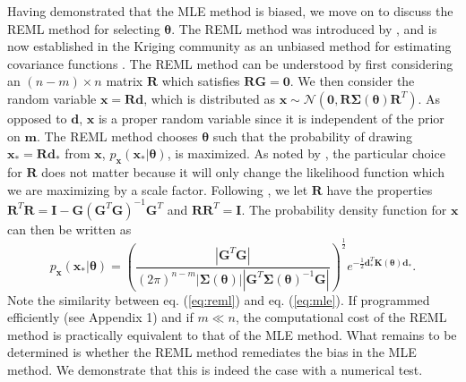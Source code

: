 \documentclass{svjour3}                     %
\begin{document}
Having demonstrated that the MLE method is biased, we move on to discuss the REML method for selecting $\mathbf{\theta}$.  The REML method was introduced by \citet{Patterson1971}, and is now established in the Kriging community as an unbiased method for estimating covariance functions \citep[e.g.,][]{Cressie1992}. The REML method can be understood by first considering an $(n-m)\times n$ matrix $\mathbf{R}$ which satisfies $\mathbf{R}\mathbf{G}=\mathbf{0}$.  We then consider the random variable $\mathbf{x}=\mathbf{R}\mathbf{d}$, which is distributed as $\mathbf{x} \sim \mathcal{N}(\mathbf{0},\mathbf{R}\mathbf{\Sigma}(\mathbf{\theta})\mathbf{R}^T)$.  As opposed to $\mathbf{d}$, $\mathbf{x}$ is a proper random variable since it is independent of the prior on $\mathbf{m}$. The REML method chooses $\mathbf{\theta}$ such that the probability of drawing $\mathbf{x}_*=\mathbf{R}\mathbf{d}_*$ from $\mathbf{x}$, $p_\mathbf{x}(\mathbf{x}_*|\mathbf{\theta})$, is maximized. As noted by \citet{Harville1974}, the particular choice for $\mathbf{R}$ does not matter because it will only change the likelihood function which we are maximizing by a scale factor. Following \citet{Harville1974}, we let $\mathbf{R}$ have the properties $\mathbf{R}^T\mathbf{R} = \mathbf{I} - \mathbf{G}(\mathbf{G}^T\mathbf{G})^{-1}\mathbf{G}^T$ and $\mathbf{R}\mathbf{R}^T = \mathbf{I}$. The probability density function for $\mathbf{x}$ can then be written as 
\begin{equation}\label{eq:reml}
p_\mathbf{x}(\mathbf{x}_*|\mathbf{\theta}) =
\left(\frac{\left|\mathbf{G}^T\mathbf{G}\right|}
           {(2\pi)^{n-m}
            \left| \mathbf{\Sigma}(\mathbf{\theta}) \right| 
            \left| \mathbf{G}^T\mathbf{\Sigma}(\mathbf{\theta})^{-1}\mathbf{G} \right|}\right)^{\frac{1}{2}} 
e^{-\tfrac{1}{2}\mathbf{d}_*^T\mathbf{K}(\mathbf{\theta})\mathbf{d}_*}.
\end{equation}
Note the similarity between eq. (\ref{eq:reml}) and eq. (\ref{eq:mle}). If programmed efficiently (see Appendix 1) and if $m \ll n$, the computational cost of the REML method is practically equivalent to that of the MLE method. What remains to be determined is whether the REML method remediates the bias in the MLE method. We demonstrate that this is indeed the case with a numerical test. 
\end{document}

